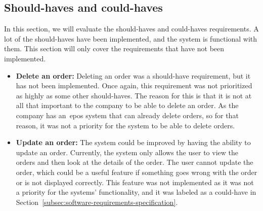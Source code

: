\subsection{Should-haves and could-haves}\label{subsec:should-haves-and-could-haves}

In this section, we will evaluate the should-haves and could-haves requirements.
A lot of the should-haves have been implemented, and the system is functional with them.
This section will only cover the requirements that have not been implemented.

\begin{itemize}
    \item \textbf{Delete an order:}
    Deleting an order was a should-have requirement, but it has not been implemented.
    Once again, this requirement was not prioritized as highly as some other should-haves.
    The reason for this is that it is not at all that important to the company to be able to delete an order.
    As the company has an~\acrshort{epos} system that can already delete orders, so for that reason, it was not a
    priority for the system to be able to delete orders.

    \item \textbf{Update an order:}
    The system could be improved by having the ability to update an order.
    Currently, the system only allows the user to view the orders and then look at the details of the order.
    The user cannot update the order, which could be a useful feature if something goes wrong with the order or is not
    displayed correctly.
    This feature was not implemented as it was not a priority for the systems' functionality, and it was labeled as a
    could-have in Section~\ref{subsec:software-requirements-specification}.
\end{itemize}
